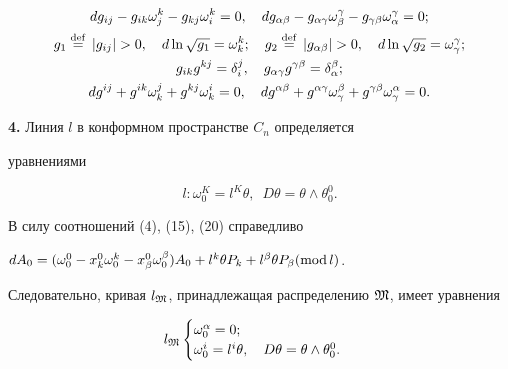 \begin{gather} 


d g_{ij}-g_{ik}\omega^k_j-g_{k j}\omega^k_i=0,\quad 


d g_{\alpha\beta}-g_{\alpha\gamma}\omega^\gamma_\beta- 


g_{\gamma\beta}\omega^\gamma_\alpha=0;\\ 


% 


g_1\eqdef|g_{ij}|>0,\quad d\ln\sqrt{g_1}=\omega^k_k;\quad 


g_2\eqdef|g_{\alpha\beta}|>0,\quad 


d\ln\sqrt{g_2}=\omega^\gamma_\gamma; \\ 


% 


g_{ik}g^{k j}=\delta^j_i,\quad 


g_{\alpha\gamma}g^{\gamma\beta}=\delta^\beta_\alpha;\notag \\ 


% 


d g^{ij}+g^{ik}\omega^j_k+g^{k j}\omega^i_k=0,\quad 


d g^{\alpha\beta}+g^{\alpha\gamma}\omega^\beta_\gamma+ 


g^{\gamma\beta}\omega^\alpha_\gamma=0.\notag 


\end{gather} 


 


{\bf 4.} Линия $l$ в конформном пространстве $C_n$ определяется 


уравнениями 


\begin{equation} 


l:\omega^K_0=l^K\theta,\ \; D\theta=\theta\wedge\theta^0_0. 


\end{equation} 


В силу соотношений (4), (15), (20) справедливо 


$d A_0=(\omega^0_0-x^0_k\omega^k_0-x^0_\beta \omega^\beta_0)A_0+ 


l^k\theta P_k+l^\beta\theta P_\beta(\Mod l)$. 


Следовательно, кривая $l_{\frak M}$, принадлежащая распределению $\frak 


M$, имеет уравнения 


\begin{equation} 


l_{\frak M}


\begin{cases} 


\omega^\alpha_0=0;\\ 


\omega^i_0=l^i\theta,\quad D\theta=\theta\wedge\theta^0_0. 


\end{cases} 


\end{equation} 


